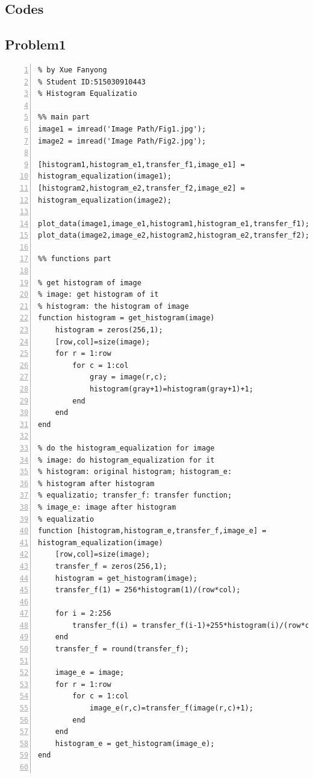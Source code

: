 \documentclass[11pt,oneside]{book}
\begin{document}
\begin{appendices}
\chapter{Codes}
\section{Problem1}

\begin{lstlisting}[numbers=left, numberstyle=\tiny,keywordstyle=\color{blue!70},commentstyle=\color{red!50!green!50!blue!50},frame=shadowbox, rulesepcolor=\color{red!20!green!20!blue!20}] 
% Problem 1
% by Xue Fanyong
% Student ID:515030910443
% Histogram Equalizatio

%% main part
image1 = imread('Image Path/Fig1.jpg');
image2 = imread('Image Path/Fig2.jpg');

[histogram1,histogram_e1,transfer_f1,image_e1] = 
histogram_equalization(image1);
[histogram2,histogram_e2,transfer_f2,image_e2] = 
histogram_equalization(image2);

plot_data(image1,image_e1,histogram1,histogram_e1,transfer_f1);
plot_data(image2,image_e2,histogram2,histogram_e2,transfer_f2);

%% functions part

% get histogram of image
% image: get histogram of it
% histogram: the histogram of image
function histogram = get_histogram(image)
    histogram = zeros(256,1);
    [row,col]=size(image);
    for r = 1:row
        for c = 1:col
            gray = image(r,c);
            histogram(gray+1)=histogram(gray+1)+1;
        end
    end
end

% do the histogram_equalization for image
% image: do histogram_equalization for it
% histogram: original histogram; histogram_e: 
% histogram after histogram
% equalizatio; transfer_f: transfer function; 
% image_e: image after histogram
% equalizatio
function [histogram,histogram_e,transfer_f,image_e] = 
histogram_equalization(image)
    [row,col]=size(image);
    transfer_f = zeros(256,1);
    histogram = get_histogram(image);
    transfer_f(1) = 256*histogram(1)/(row*col);
    
    for i = 2:256
        transfer_f(i) = transfer_f(i-1)+255*histogram(i)/(row*col);
    end
    transfer_f = round(transfer_f);
    
    image_e = image;
    for r = 1:row
        for c = 1:col
            image_e(r,c)=transfer_f(image(r,c)+1);
        end
    end
    histogram_e = get_histogram(image_e);
end


\end{lstlisting}
\end{appendices}
\end{document}
